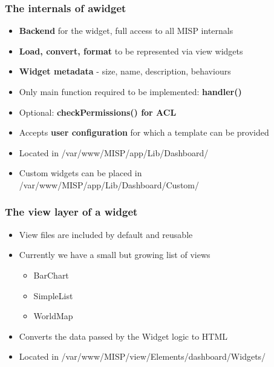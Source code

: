\begin{frame}
  \frametitle{The internals of awidget}
        \begin{itemize}
            \item {\bf Backend} for the widget, full access to all MISP internals
            \item {\bf Load, convert, format} to be represented via view widgets
            \item {\bf Widget metadata} - size, name, description, behaviours
            \item Only main function required to be implemented: {\bf handler()}
            \item Optional: {\bf checkPermissions() for ACL}
            \item Accepts {\bf user configuration} for which a template can be provided
            \item Located in /var/www/MISP/app/Lib/Dashboard/
            \item Custom widgets can be placed in /var/www/MISP/app/Lib/Dashboard/Custom/
        \end{itemize}
\end{frame}

\begin{frame}
  \frametitle{The view layer of a widget}
  \begin{itemize}
        \item View files are included by default and reusable
        \item Currently we have a small but growing list of views
        \begin{itemize}
            \item BarChart
            \item SimpleList
            \item WorldMap
        \end{itemize}
        \item Converts the data passed by the Widget logic to HTML
        \item Located in /var/www/MISP/view/Elements/dashboard/Widgets/
  \end{itemize}
\end{frame}


